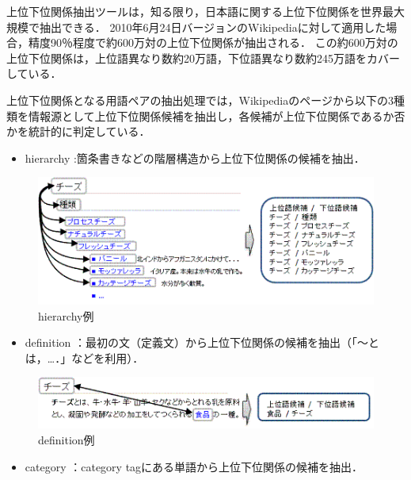  上位下位関係抽出ツールは，知る限り，日本語に関する上位下位関係を世界最大規模で抽出できる． 2010年6月24日バージョンのWikipediaに対して適用した場合，精度90％程度で約600万対の上位下位関係が抽出される． この約600万対の上位下位関係は，上位語異なり数約20万語，下位語異なり数約245万語をカバーしている． \cite{Hyponymy}

上位下位関係となる用語ペアの抽出処理では，Wikipediaのページから以下の3種類を情報源として上位下位関係候補を抽出し，各候補が上位下位関係であるか否かを統計的に判定している．

\begin{itemize}
 \item hierarchy :箇条書きなどの階層構造から上位下位関係の候補を抽出．
\end{itemize}

\begin{figure}[hb]
\centering
\includegraphics[width=13cm]{hierarchy}
\caption{hierarchy例}\label{hierarchy}
\end{figure}

\begin{itemize}
 \item definition ：最初の文（定義文）から上位下位関係の候補を抽出（「～とは，…．」などを利用）．
\end{itemize}

\begin{figure}[hb]
\centering
\includegraphics[width=13cm]{definition}
\caption{definition例}\label{definition}
\end{figure}

\begin{itemize}
 \item category ：category tagにある単語から上位下位関係の候補を抽出．
\end{itemize}

